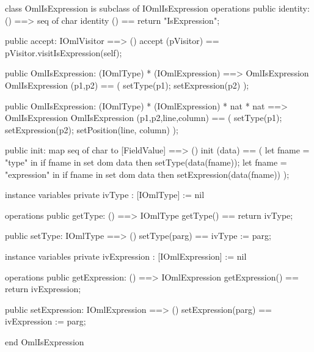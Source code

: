 \begin{vdm_al}
class OmlIsExpression is subclass of IOmlIsExpression
operations
  public identity: () ==> seq of char
  identity () == return "IsExpression";

  public accept: IOmlVisitor ==> ()
  accept (pVisitor) == pVisitor.visitIsExpression(self);

  public OmlIsExpression:
    (IOmlType) *
    (IOmlExpression) ==> OmlIsExpression
  OmlIsExpression (p1,p2) == 
    ( setType(p1);
      setExpression(p2) );

  public OmlIsExpression:
    (IOmlType) *
    (IOmlExpression) *
    nat *
    nat ==> OmlIsExpression
  OmlIsExpression (p1,p2,line,column) == 
    ( setType(p1);
      setExpression(p2);
      setPosition(line, column) );

  public init: map seq of char to [FieldValue] ==> ()
  init (data) ==
    ( let fname = "type" in
        if fname in set dom data
        then setType(data(fname));
      let fname = "expression" in
        if fname in set dom data
        then setExpression(data(fname)) );

instance variables
  private ivType : [IOmlType] := nil

operations
  public getType: () ==> IOmlType
  getType() == return ivType;

  public setType: IOmlType ==> ()
  setType(parg) == ivType := parg;

instance variables
  private ivExpression : [IOmlExpression] := nil

operations
  public getExpression: () ==> IOmlExpression
  getExpression() == return ivExpression;

  public setExpression: IOmlExpression ==> ()
  setExpression(parg) == ivExpression := parg;

end OmlIsExpression
\end{vdm_al}


